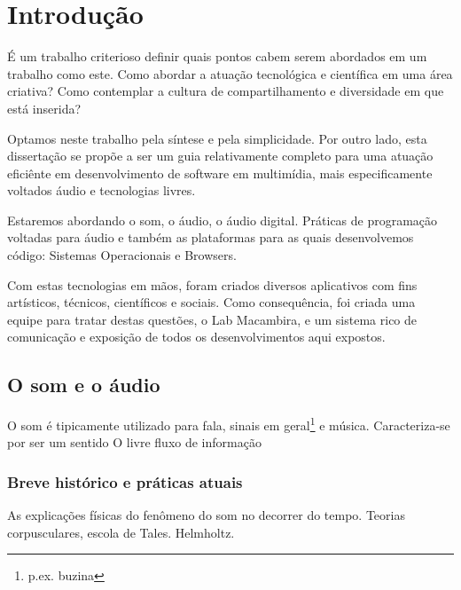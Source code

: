 \chapter{Introdução} %
\label{cap:intro} %

É um trabalho criterioso definir quais pontos cabem serem abordados em um trabalho como este.
Como abordar a atuação tecnológica e científica em uma área criativa? Como contemplar
a cultura de compartilhamento e diversidade em que está inserida?

Optamos neste trabalho pela síntese e pela simplicidade. Por outro lado, esta dissertação
se propõe a ser um guia relativamente completo para uma atuação eficiênte em desenvolvimento
de software em multimídia, mais especificamente voltados áudio e tecnologias livres.

Estaremos abordando o som, o áudio, o áudio digital. Práticas de programação voltadas para
áudio e também as plataformas para as quais desenvolvemos código: Sistemas Operacionais e Browsers.

Com estas tecnologias em mãos, foram criados diversos aplicativos com fins artísticos,
técnicos, científicos e sociais. Como consequência, foi criada uma equipe para tratar
destas questões, o Lab Macambira, e um sistema rico de comunicação e exposição de todos
os desenvolvimentos aqui expostos.


\section{O som e o áudio}

O som é tipicamente utilizado para fala, sinais em geral\footnote{p.ex. buzina} e música.
Caracteriza-se por ser um sentido   O livre fluxo de informação

\subsection{Breve histórico e práticas atuais}

As explicações físicas do fenômeno do som no decorrer do tempo. Teorias
corpusculares, escola de Tales. Helmholtz.

